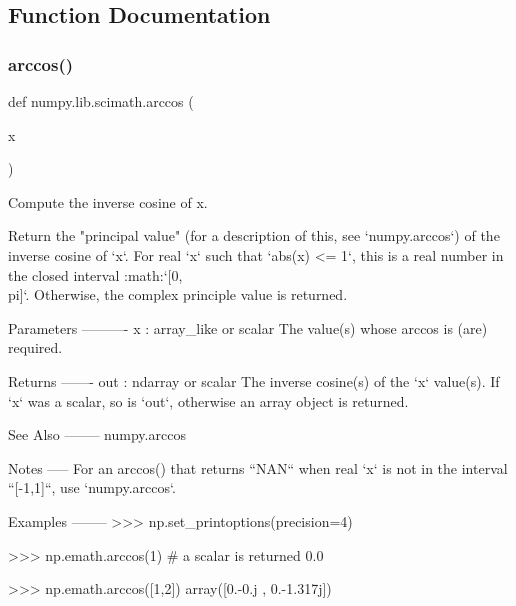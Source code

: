 \subsection{Function Documentation}
\mbox{\label{namespacenumpy_1_1lib_1_1scimath_a86d091c95419b41624c14bba0f8f984a}} 
\subsubsection{\texorpdfstring{arccos()}{arccos()}}
{\footnotesize\ttfamily def numpy.\+lib.\+scimath.\+arccos (\begin{DoxyParamCaption}\item[{}]{x }\end{DoxyParamCaption})}

\begin{DoxyVerb}Compute the inverse cosine of x.

Return the "principal value" (for a description of this, see
`numpy.arccos`) of the inverse cosine of `x`. For real `x` such that
`abs(x) <= 1`, this is a real number in the closed interval
:math:`[0, \\pi]`.  Otherwise, the complex principle value is returned.

Parameters
----------
x : array_like or scalar
   The value(s) whose arccos is (are) required.

Returns
-------
out : ndarray or scalar
   The inverse cosine(s) of the `x` value(s). If `x` was a scalar, so
   is `out`, otherwise an array object is returned.

See Also
--------
numpy.arccos

Notes
-----
For an arccos() that returns ``NAN`` when real `x` is not in the
interval ``[-1,1]``, use `numpy.arccos`.

Examples
--------
>>> np.set_printoptions(precision=4)

>>> np.emath.arccos(1) # a scalar is returned
0.0

>>> np.emath.arccos([1,2])
array([0.-0.j   , 0.-1.317j])\end{DoxyVerb}
 \mbox{\label{namespacenumpy_1_1lib_1_1scimath_a056e2ee08f73ea14121699d1d53ce962}} 
